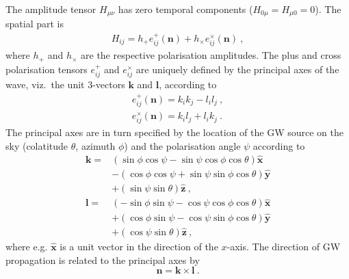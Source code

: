\documentclass[fleqn,usenatbib,useAMS]{mnras}
\begin{document}
The amplitude tensor $H_{\mu \nu}$ has zero temporal components ($H_{0 \mu} = H_{\mu 0} = 0$). The spatial part is
\begin{align}
	H_{ij} = h_+ e_{ij}^+(\boldsymbol{n}) + h_{\times} e_{ij}^{\times}(\boldsymbol{n}) \ , \label{eq:hij}
\end{align}
where $h_{+}$ and $h_{\times}$ are the respective polarisation amplitudes. The plus and cross polarisation tensors $e_{ij}^{+}$ and $e_{ij}^{\times}$ are uniquely defined by the principal axes of the wave, viz.\ the unit 3-vectors $\boldsymbol{k}$ and $\boldsymbol{l}$, according to
\begin{align}
	e_{i j}^{+}(\boldsymbol{n}) =k_i k_j-l_i l_j \ , \\
		e_{i j}^{\times}(\boldsymbol{n}) =k_i l_j+l_i k_j \ .
\end{align}
The principal axes are in turn specified by the location of the GW source on the sky (colatitude $\theta$, azimuth $\phi$) and the polarisation angle $\psi$ according to
\begin{align}
	\boldsymbol{k}  = &(\sin \phi \cos \psi-\sin \psi \cos \phi \cos \theta) \boldsymbol{\hat{x}} \nonumber \\
	& -(\cos \phi \cos \psi+\sin \psi \sin \phi \cos \theta) \boldsymbol{\hat{y}} \nonumber \\
	& +(\sin \psi \sin \theta) \boldsymbol{\hat{z}} \ , \\
	\boldsymbol{l} = &(-\sin \phi \sin \psi-\cos \psi \cos \phi \cos \theta) \boldsymbol{\hat{x}} \nonumber \\
	& +(\cos \phi \sin \psi-\cos \psi \sin \phi \cos \theta) \boldsymbol{\hat{y}}\nonumber  \\
	& +(\cos \psi \sin \theta) \boldsymbol{\hat{z}} \ ,
\end{align}
where e.g. $\boldsymbol{\hat{x}}$ is a unit vector in the direction of the $x$-axis. The direction of GW propagation is related to the principal axes by
\begin{equation}
	\boldsymbol{n} = \boldsymbol{k} \times \boldsymbol{l} \ . 
\end{equation}
\end{document}

